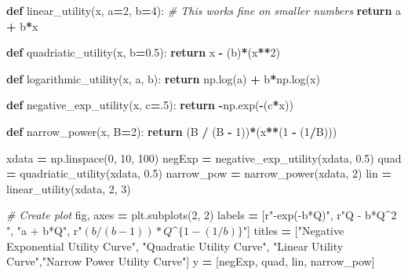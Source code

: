 \documentclass[
]{book}
\newenvironment{Shaded}{\begin{snugshade}}{\end{snugshade}}
\newcommand{\CommentTok}[1]{\textcolor[rgb]{0.56,0.35,0.01}{\textit{#1}}}
\newcommand{\ControlFlowTok}[1]{\textcolor[rgb]{0.13,0.29,0.53}{\textbf{#1}}}
\newcommand{\DecValTok}[1]{\textcolor[rgb]{0.00,0.00,0.81}{#1}}
\newcommand{\FloatTok}[1]{\textcolor[rgb]{0.00,0.00,0.81}{#1}}
\newcommand{\KeywordTok}[1]{\textcolor[rgb]{0.13,0.29,0.53}{\textbf{#1}}}
\newcommand{\NormalTok}[1]{#1}
\newcommand{\OperatorTok}[1]{\textcolor[rgb]{0.81,0.36,0.00}{\textbf{#1}}}
\newcommand{\StringTok}[1]{\textcolor[rgb]{0.31,0.60,0.02}{#1}}
\newcommand{\VerbatimStringTok}[1]{\textcolor[rgb]{0.31,0.60,0.02}{#1}}
\theoremstyle{definition}
\theoremstyle{definition}
\theoremstyle{definition}
\theoremstyle{remark}
\begin{document}
\begin{Shaded}
\begin{Highlighting}[]
\KeywordTok{def}\NormalTok{ linear\_utility(x, a}\OperatorTok{=}\DecValTok{2}\NormalTok{, b}\OperatorTok{=}\DecValTok{4}\NormalTok{):}
    \CommentTok{\# This works fine on smaller numbers}
    \ControlFlowTok{return}\NormalTok{ a }\OperatorTok{+}\NormalTok{ b}\OperatorTok{*}\NormalTok{x}

\KeywordTok{def}\NormalTok{ quadriatic\_utility(x, b}\OperatorTok{=}\FloatTok{0.5}\NormalTok{):}
    \ControlFlowTok{return}\NormalTok{ x }\OperatorTok{{-}}\NormalTok{ (b)}\OperatorTok{*}\NormalTok{(x}\OperatorTok{**}\DecValTok{2}\NormalTok{)}

\KeywordTok{def}\NormalTok{ logarithmic\_utility(x, a, b):}
    \ControlFlowTok{return}\NormalTok{ np.log(a) }\OperatorTok{+}\NormalTok{ b}\OperatorTok{*}\NormalTok{np.log(x)}

\KeywordTok{def}\NormalTok{ negative\_exp\_utility(x, c}\OperatorTok{=}\FloatTok{.5}\NormalTok{):}
    \ControlFlowTok{return} \OperatorTok{{-}}\NormalTok{np.exp(}\OperatorTok{{-}}\NormalTok{(c}\OperatorTok{*}\NormalTok{x))}

\KeywordTok{def}\NormalTok{ narrow\_power(x, B}\OperatorTok{=}\DecValTok{2}\NormalTok{):}
    \ControlFlowTok{return}\NormalTok{ (B }\OperatorTok{/}\NormalTok{ (B }\OperatorTok{{-}} \DecValTok{1}\NormalTok{))}\OperatorTok{*}\NormalTok{(x}\OperatorTok{**}\NormalTok{(}\DecValTok{1} \OperatorTok{{-}}\NormalTok{ (}\DecValTok{1}\OperatorTok{/}\NormalTok{B)))}

\NormalTok{xdata }\OperatorTok{=}\NormalTok{ np.linspace(}\DecValTok{0}\NormalTok{, }\DecValTok{10}\NormalTok{, }\DecValTok{100}\NormalTok{)}
\NormalTok{negExp }\OperatorTok{=}\NormalTok{ negative\_exp\_utility(xdata, }\FloatTok{0.5}\NormalTok{)}
\NormalTok{quad }\OperatorTok{=}\NormalTok{ quadriatic\_utility(xdata, }\FloatTok{0.5}\NormalTok{)}
\NormalTok{narrow\_pow }\OperatorTok{=}\NormalTok{ narrow\_power(xdata, }\DecValTok{2}\NormalTok{)}
\NormalTok{lin }\OperatorTok{=}\NormalTok{ linear\_utility(xdata, }\DecValTok{2}\NormalTok{, }\DecValTok{3}\NormalTok{)}

\CommentTok{\# Create plot}
\NormalTok{fig, axes }\OperatorTok{=}\NormalTok{ plt.subplots(}\DecValTok{2}\NormalTok{, }\DecValTok{2}\NormalTok{)}
\NormalTok{labels }\OperatorTok{=}\NormalTok{ [}\VerbatimStringTok{r"{-}exp({-}b*Q)"}\NormalTok{, }\VerbatimStringTok{r"Q {-} b*Q$\^{}2$"}\NormalTok{, }\StringTok{"a + b*Q"}\NormalTok{, }\VerbatimStringTok{r"$(b / (b{-}1))*Q\^{}\{1{-}(1/b)\}$"}\NormalTok{]}
\NormalTok{titles }\OperatorTok{=}\NormalTok{ [}\StringTok{"Negative Exponential Utility Curve"}\NormalTok{, }\StringTok{"Quadratic Utility Curve"}\NormalTok{, }
          \StringTok{"Linear Utility Curve"}\NormalTok{,}\StringTok{"Narrow Power Utility Curve"}\NormalTok{]}
\NormalTok{y }\OperatorTok{=}\NormalTok{ [negExp, quad, lin, narrow\_pow]}


\end{Highlighting}
\end{Shaded}
\end{document}
